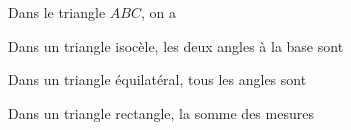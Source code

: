 \documentclass[12pt,a4paper]{article}
\begin{document}
\begin{myexs}
	\begin{multicols}{2}
		\vspace*{1cm}
		Dans le triangle $ABC$, on a \\ %
		\vspace*{1cm}
		
		
		Dans un triangle isocèle, les deux angles à la base sont %
		\vspace*{2.5cm}
		
		
		Dans un triangle équilatéral, tous les angles sont %
		
		\vspace*{2.5cm}
		
		Dans un triangle rectangle, la somme des mesures %
		

\end{multicols}
\end{myexs}
\end{document}
